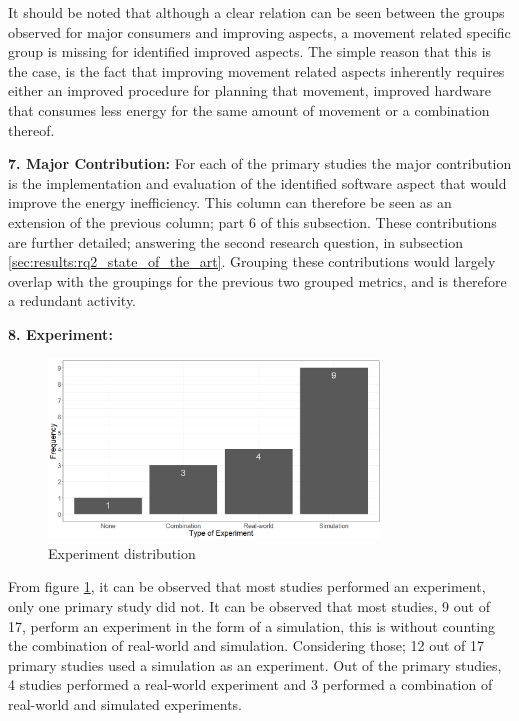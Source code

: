 It should be noted that although a clear relation can be seen between the groups observed for major consumers and improving aspects, 
a movement related specific group is missing for identified improved aspects.
The simple reason that this is the case, is the fact that improving movement related aspects inherently requires either 
an improved procedure for planning that movement, improved hardware that consumes less energy for the same amount of movement
or a combination thereof.

\vspace{2mm}

\noindent\textbf{7. Major Contribution:}
For each of the primary studies the major contribution is the implementation and evaluation of the identified software aspect that would
improve the energy inefficiency. 
This column can therefore be seen as an extension of the previous column; part 6 of this subsection.
These contributions are further detailed; answering the second research question, in subsection \ref{sec:results:rq2_state_of_the_art}.
Grouping these contributions would largely overlap with the groupings for the previous two grouped metrics, and is therefore a redundant activity.

\vspace{2mm}

\noindent\textbf{8. Experiment:}
\begin{figure}
    \includegraphics[width=250pt]{figures/exp_freq_barplot.png}
    \caption{Experiment distribution}
    \label{fig:experiment_distr}
\end{figure}
From figure \ref{fig:experiment_distr}, it can be observed that most studies performed an experiment, only one primary study did not.
It can be observed that most studies, 9 out of 17, perform an experiment in the form of a simulation, 
this is without counting the combination of real-world and simulation.
Considering those; 12 out of 17 primary studies used a simulation as an experiment.
Out of the primary studies, 4 studies performed a real-world experiment and 3 performed a combination of real-world and simulated experiments.

